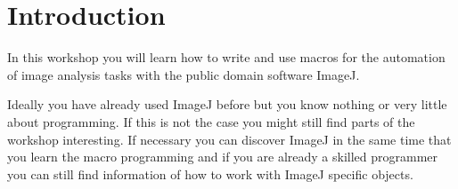 \chapter{Introduction}

In this workshop you will learn how to write and use macros for the automation of image analysis tasks with the public domain software ImageJ\cite{schneider_nih_2012}. 

Ideally you have already used ImageJ before but you know nothing or very little about programming. If this is not the case you might still find parts of the workshop interesting. If necessary you can discover ImageJ in the same time that you learn the macro programming and if you are already a skilled programmer you can still find information of how to work with ImageJ specific objects.


